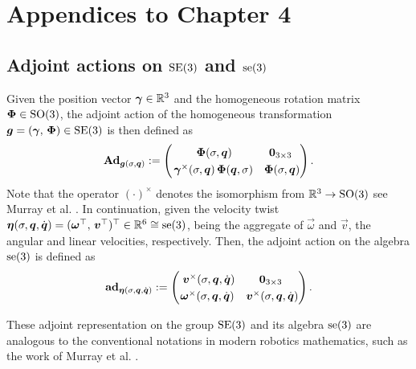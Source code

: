 \chapter{Appendices to Chapter 4}
\vspace{-10mm}
\section{Adjoint actions on $\textup{\textrm{SE}}(3)$ and $\textup{\textrm{se}}(3)$} 
\label{app:C2:adjoint}  
\noindent Given the position vector ${\boldsymbol{\gamma}} \in \mathbb{R}^3$ and the homogeneous rotation matrix ${\boldsymbol{\Phi}} \in \textup{\textrm{SO}}(3)$, the adjoint action of the homogeneous transformation $\boldsymbol{g} = ({\boldsymbol{\gamma}},\,{\boldsymbol{\Phi}}) \in \textup{\textrm{SE}}(3)$ is then defined as
%
\begin{equation}
\renewcommand*{\arraystretch}{1.25}{}
\Ad_{\vec{g}(\sigma,\q)} := \begin{pmatrix}
\; {\PhiB}(\sigma,\q) & \vec{0}_{3\times3} \; \\
\hspace{0.5mm} \gammaB^{\times}(\sigma,{\q})\,{\PhiB}({\q},\sigma) & {\PhiB}(\sigma,{\q})
\end{pmatrix}. 
\label{eq:C2:adjoint_matrix}
\end{equation}
%
Note that the operator $(\cdot)^\times$ denotes the isomorphism from $\mathbb{R}^3 \to \textup{\textrm{SO}}(3)$ see Murray et al. \cite{Murray1994}. In continuation, given the velocity twist ${\boldsymbol{\eta}}(\sigma,{\boldsymbol{q}},{\dot{\boldsymbol{q}}}) = (\boldsymbol{\omega}^\top,\,\boldsymbol{v}^\top)^\top \in \mathbb{R}^6 \cong \textup{\textrm{se}}(3)$, being the aggregate of $\vec{\omega}$ and $\vec{v}$, the angular and linear velocities, respectively. Then, the adjoint action on the algebra $\textup{\textrm{se}}(3)$ is defined as
%
\begin{equation}
\renewcommand*{\arraystretch}{1.25}{}
\ad_{\etaB(\sigma,\q,\dq)} := \begin{pmatrix}
\; \vB^{\times}(\sigma,\q,\dq) & \vec{0}_{3\times3} \; \\
 \vec{\omega}^{\times}(\sigma,\q,\dq) & \vB^{\times} (\sigma,\q,\dq)
\end{pmatrix}. 
\label{eq:C2:adjoint_matrix_algebra}
\end{equation}
%

\noindent These adjoint representation on the group $\textup{\textrm{SE}}(3)$ and its algebra $\textup{\textrm{se}}(3)$ are analogous to the conventional notations in modern robotics mathematics, such as the work of Murray et al. \cite{Murray1994}.


